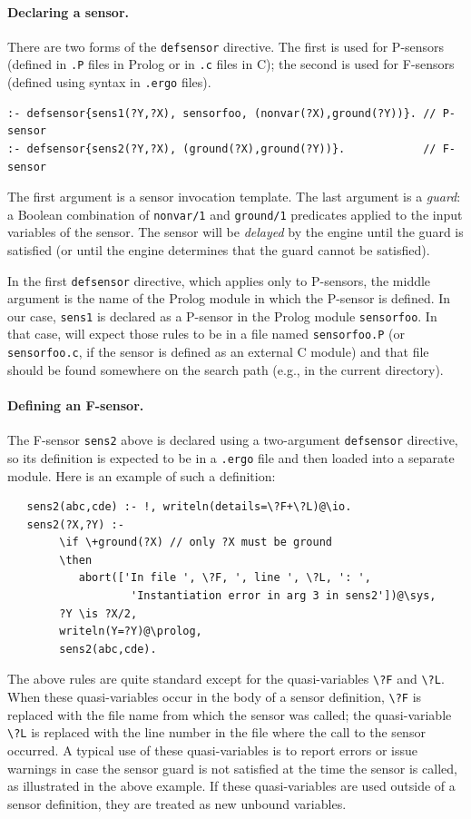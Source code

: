 \documentclass[11pt]{article}
\newcommand{\ERGO}{\mbox{\smaller{\ensuremath{\cal{E}}\smaller{{\sc{RGO}}}}}\xspace}
\newcommand{\FLSYSTEM}{\ERGO}
\newcommand{\ergoext}{ergo\xspace}
\newcommand{\bs}{\textbackslash}
\begin{document}
\paragraph{Declaring a sensor.}
There are two forms of the \texttt{defsensor} directive. The first is used for
P-sensors (defined in \texttt{.P} files in Prolog or in \texttt{.c} files
in C); the second is used for
F-sensors (defined using \FLSYSTEM syntax in \texttt{.\ergoext} files).
\begin{verbatim}
:- defsensor{sens1(?Y,?X), sensorfoo, (nonvar(?X),ground(?Y))}. // P-sensor
:- defsensor{sens2(?Y,?X), (ground(?X),ground(?Y))}.            // F-sensor
\end{verbatim}
The first argument is a sensor invocation template.  The last argument
is a \emph{guard}: a Boolean combination of \texttt{nonvar/1} and
\texttt{ground/1} predicates applied to the input variables of the
sensor. The sensor will be \emph{delayed} by the \FLSYSTEM engine until the
guard is satisfied (or until the engine determines that the guard cannot be
satisfied).

In the first \texttt{defsensor} directive, which applies only to P-sensors,
the middle argument is the name
of the Prolog module in which the P-sensor is defined. 
In our case, \texttt{sens1} is declared as a P-sensor
in the Prolog module \texttt{sensorfoo}. In that case, \FLSYSTEM
will expect those rules to be in a file named \texttt{sensorfoo.P}
(or \texttt{sensorfoo.c}, if the sensor is defined as an external C module)
and that file should be found somewhere on the \FLSYSTEM search path (e.g., in
the current directory).

\paragraph{Defining an F-sensor.}
The F-sensor \texttt{sens2} above is declared using a
two-argument \texttt{defsensor}  directive, so its definition is expected to be in a
\texttt{.\ergoext} file and then loaded into a separate \FLSYSTEM module.
Here is an example of such a definition:
\begin{verbatim}
   sens2(abc,cde) :- !, writeln(details=\?F+\?L)@\io.
   sens2(?X,?Y) :-
        \if \+ground(?X) // only ?X must be ground
        \then
           abort(['In file ', \?F, ', line ', \?L, ': ',
                   'Instantiation error in arg 3 in sens2'])@\sys,
        ?Y \is ?X/2,
        writeln(Y=?Y)@\prolog,
        sens2(abc,cde).
\end{verbatim}
The above rules are quite standard except for the quasi-variables
\texttt{\bs{}?F} and \texttt{\bs{}?L}. When these quasi-variables occur in the body of a
sensor definition, \texttt{\bs{}?F} is replaced with the file name from which
the sensor was called; the quasi-variable \texttt{\bs{}?L} is replaced with the line
number in the file where the call to the sensor occurred.
A typical use of these quasi-variables is to report errors or issue warnings in case
the sensor guard is not satisfied at the time the sensor is called, as
illustrated in the above example.
If these quasi-variables are used outside of a sensor definition, they are treated
as new unbound variables.
\end{document}
